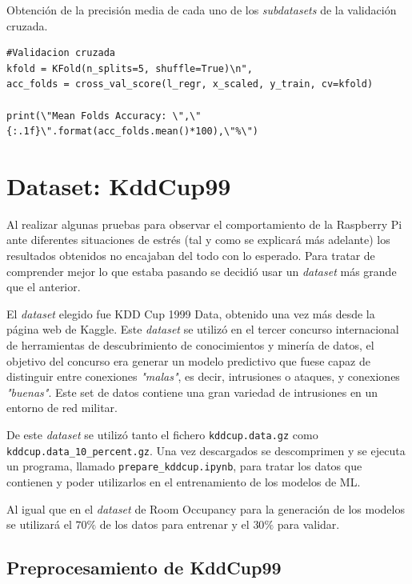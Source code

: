 \documentclass[a4paper, 12pt]{book}
\begin{document}
 \begin{listing}[htb]
    \caption{Obtención de la precisión media de cada uno de los \textit{subdatasets} de la validación cruzada.}{}
    \label{lst:get_CV}
    \begin{verbatim}
#Validacion cruzada
kfold = KFold(n_splits=5, shuffle=True)\n",
acc_folds = cross_val_score(l_regr, x_scaled, y_train, cv=kfold)

print(\"Mean Folds Accuracy: \",\"{:.1f}\".format(acc_folds.mean()*100),\"%\")
    \end{verbatim}
\end{listing}
 


\section{Dataset: KddCup99}
\label{subsec:dataset_kddcup99}

Al realizar algunas pruebas para observar el comportamiento de la Raspberry Pi ante diferentes situaciones de estrés (tal y como se explicará más adelante) los resultados obtenidos no encajaban del todo con lo esperado. Para tratar de comprender mejor lo que estaba pasando se decidió usar un \textit{dataset} más grande que el anterior.

El \textit{dataset} elegido fue KDD Cup 1999 Data\cite{DataSetKddCup99}, obtenido una vez más desde la página web de Kaggle. Este \textit{dataset} se utilizó en el tercer concurso internacional de herramientas de descubrimiento de conocimientos y minería de datos, el objetivo del concurso era generar un modelo predictivo que fuese capaz de distinguir entre conexiones \textit{"malas"}, es decir, intrusiones o ataques, y conexiones \textit{"buenas"}. Este set de datos contiene una gran variedad de intrusiones en un entorno de red militar. 

De este \textit{dataset} se utilizó tanto el fichero \texttt{kddcup.data.gz} como \\\texttt{kddcup.data\_10\_percent.gz}. Una vez descargados se descomprimen y se ejecuta un programa, llamado \texttt{prepare\_kddcup.ipynb}, para tratar los datos que contienen y poder utilizarlos en el entrenamiento de los modelos de ML.

Al igual que en el \textit{dataset} de Room Occupancy para la generación de los modelos se utilizará el $70\%$ de los datos para entrenar y el $30\%$ para validar.

\subsection{Preprocesamiento de KddCup99}
\label{subsec:preprocesamiento_kddcup}
\end{document}
